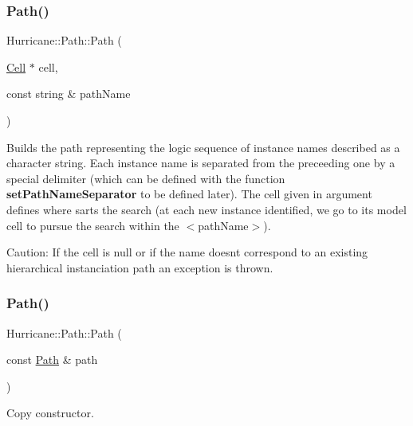 \subsubsection{\texorpdfstring{Path()}{Path()}\hspace{0.1cm}{\footnotesize\ttfamily [5/6]}}
{\footnotesize\ttfamily Hurricane\+::\+Path\+::\+Path (\begin{DoxyParamCaption}\item[{\hyperlink{classHurricane_1_1Cell}{Cell} $\ast$}]{cell,  }\item[{const string \&}]{path\+Name }\end{DoxyParamCaption})}

Builds the path representing the logic sequence of instance names described as a character string. Each instance name is separated from the preceeding one by a special delimiter (which can be defined with the function {\bfseries set\+Path\+Name\+Separator} to be defined later). The cell given in argument defines where sarts the search (at each new instance identified, we go to its model cell to pursue the search within the {\ttfamily $<$path\+Name$>$}).

\begin{DoxyParagraph}{Caution\+:}
If the cell is null or if the name doesn\textquotesingle{}t correspond to an existing hierarchical instanciation path an exception is thrown. 
\end{DoxyParagraph}
\mbox{\label{classHurricane_1_1Path_a8db875f788013ec5ad8ed517cf1e1715}} 
\subsubsection{\texorpdfstring{Path()}{Path()}\hspace{0.1cm}{\footnotesize\ttfamily [6/6]}}
{\footnotesize\ttfamily Hurricane\+::\+Path\+::\+Path (\begin{DoxyParamCaption}\item[{const \hyperlink{classHurricane_1_1Path}{Path} \&}]{path }\end{DoxyParamCaption})}

Copy constructor. \mbox{\label{classHurricane_1_1Path_a6226639f50213598ffad86031afe69ff}} 

